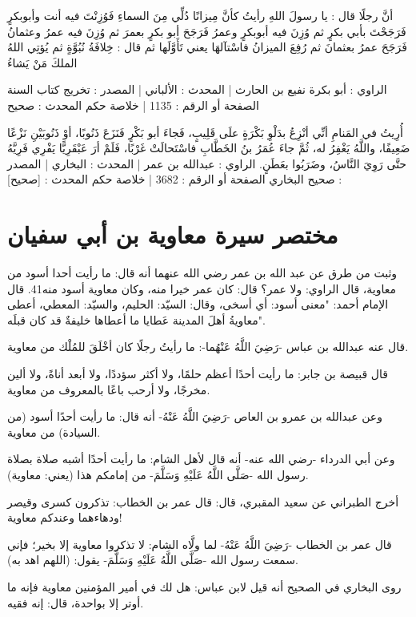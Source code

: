 أنَّ رجلًا قال : يا رسولَ اللهِ رأيتُ كأنَّ مِيزانًا دُلِّي مِنَ السماءِ فَوُزِنْتَ فيه أنت وأبوبكرٍ فَرَجَحْتَ بأبي بكرٍ ثم وُزِنَ فيه أبوبكرٍ وعمرُ فَرَجَحَ أبو بكرٍ بعمرَ ثم وُزِنَ فيه عمرُ وعثمانُ فَرَجَحَ عمرُ بعثمانَ ثم رُفِعَ الميزانُ فاسْتآلهَا يعني تَأَوَّلَها ثم قال : خِلافَةُ نُبُوَّةٍ ثم يُؤتِي اللهُ الملكَ مَنْ يَشاءُ

الراوي : أبو بكرة نفيع بن الحارث | المحدث : الألباني | المصدر : تخريج كتاب السنة
الصفحة أو الرقم : 1135 | خلاصة حكم المحدث : صحيح 

أُرِيتُ في المَنامِ أنِّي أنْزِعُ بدَلْوِ بَكْرَةٍ علَى قَلِيبٍ، فَجاءَ أبو بَكْرٍ فَنَزَعَ ذَنُوبًا، أوْ ذَنُوبَيْنِ نَزْعًا ضَعِيفًا، واللَّهُ يَغْفِرُ له، ثُمَّ جاءَ عُمَرُ بنُ الخَطَّابِ فاسْتَحالَتْ غَرْبًا، فَلَمْ أرَ عَبْقَرِيًّا يَفْرِي فَرِيَّهُ حتَّى رَوِيَ النَّاسُ، وضَرَبُوا بعَطَنٍ.
الراوي : عبدالله بن عمر | المحدث : البخاري | المصدر : صحيح البخاري
الصفحة أو الرقم : 3682 | خلاصة حكم المحدث : [صحيح] 

\section{مختصر سيرة معاوية بن أبي سفيان}


وثبت من طرق عن عبد الله بن عمر رضي الله عنهما أنه قال: ما رأيت أحدا أسود من معاوية، قال الراوي: ولا عمر؟ قال: كان عمر خيرا منه، وكان معاوية أسود منه41.
قال الإمام أحمد: "معنى أسود: أي أسخى، وقال: السيّد: الحليم، والسيّد: المعطي، أعطى معاويةُ أهلَ المدينة عَطايا ما أعطاها خليفةٌ قد كان قبلَه".

قال عنه عبدالله بن عباس -رَضِيَ اللَّهُ عَنْهُما-: ما رأيتُ رجلًا كان أخْلَقَ للمُلْك من معاوية.

قال قبيصة بن جابر: ما رأيت أحدًا أعظم حلمًا، ولا أكثر سؤددًا، ولا أبعد أناةً، ولا ألين مخرجًا، ولا أرحب باعًا بالمعروف من معاوية.

وعن عبدالله بن عمرو بن العاص -رَضِيَ اللَّهُ عَنْهُ- أنه قال: ما رأيت أحدًا أسود (من السيادة) من معاوية.

وعن أبي الدرداء -رضي الله عنه- أنه قال لأهل الشام: ما رأيت أحدًا أشبه صلاة بصلاة رسول الله -صَلَّى اللَّهُ عَلَيْهِ وَسَلَّمَ- من إمامكم هذا (يعني: معاوية).

أخرج الطبراني عن سعيد المقبري، قال: قال عمر بن الخطاب: تذكرون كسرى وقيصر ودهاءهما وعندكم معاوية!

قال عمر بن الخطاب -رَضِيَ اللَّهُ عَنْهُ- لما ولَّاه الشام: لا تذكروا معاوية إلا بخير؛ فإني سمعت رسول الله -صَلَّى اللَّهُ عَلَيْهِ وَسَلَّمَ- يقول: (اللهم اهد به).

روى البخاري في الصحيح أنه قيل لابن عباس: هل لك في أمير المؤمنين معاوية فإنه ما أوتر إلا بواحدة، قال: إنه فقيه.

